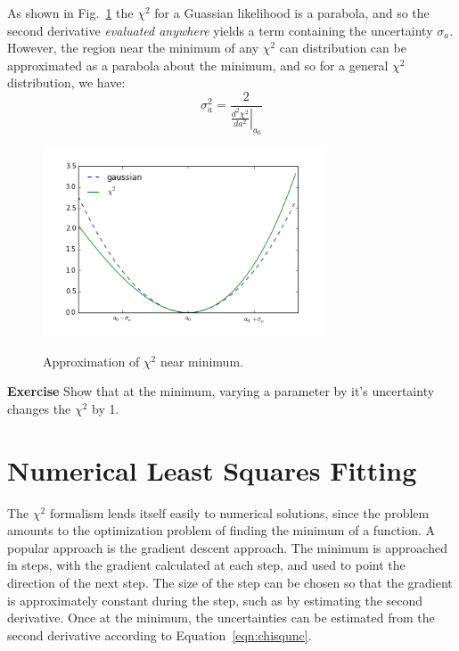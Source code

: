 \documentclass[12pt]{article}
\begin{document}
As shown in Fig.~\ref{fig:chisq} the $\chi^2$ for a Guassian likelihood is a parabola, and so the second derivative {\em evaluated anywhere} yields a term containing the uncertainty $\sigma_a$.  However, the region near the minimum of any $\chi^2$ can distribution can be approximated as a parabola about the minimum, and so for a general $\chi^2$ distribution, we have:
\begin{equation} \label{eqn:chisqunc}
\sigma_a^2  = \frac{2}{\left. \frac{d^2\chi^2}{da^2} \right|_{a_0}}
\end{equation}

\begin{figure}[htbp]
\begin{center}
{\includegraphics[width=0.75\textwidth]{figs/chisq.png}}
\end{center}
\caption{\label{fig:chisq} Approximation of $\chi^2$ near minimum.}
\end{figure}

{\bf Exercise} Show that at the minimum, varying a parameter by it's uncertainty changes the $\chi^2$ by 1.

\section{Numerical Least Squares Fitting}

The $\chi^2$ formalism lends itself easily to numerical solutions, since the problem amounts to the optimization problem of finding the minimum of a function.  A popular approach is the gradient descent approach.  The minimum is approached in steps, with the gradient calculated at each step, and used to point the direction of the next step.  The size of the step can be chosen so that the gradient is approximately constant during the step, such as by estimating the second derivative.  Once at the minimum, the uncertainties can be estimated from the second derivative according to Equation~\ref{eqn:chisqunc}.
\end{document}
